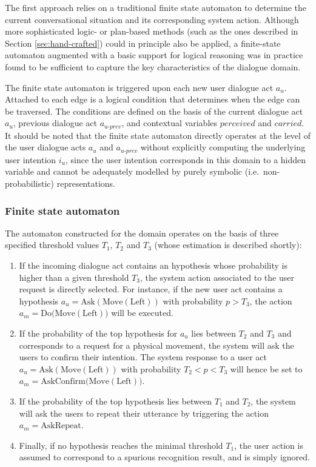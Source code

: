 The first approach relies on a traditional finite state automaton to determine the current conversational situation and its corresponding system action.  Although more sophisticated logic- or plan-based methods (such as the ones described in Section \ref{sec:hand-crafted}) could in principle also be applied, a finite-state automaton augmented with a basic support for logical reasoning was in practice found to be sufficient to capture the key characteristics of the dialogue domain. 

The finite state automaton is triggered upon each new user dialogue act $a_u$. Attached to each edge is a logical condition that determines when the edge can be traversed. The conditions are defined on the basis of the current dialogue act $a_u$, previous dialogue act $a_{u\mbox{-}prev}$, and contextual variables $\mathit{perceived}$ and $\mathit{carried}$. It should be noted that the finite state automaton directly operates at the level of the user dialogue acts $a_u$ and $a_{u\mbox{-}prev}$ without explicitly computing the underlying user intention $i_u$, since the user intention corresponds in this domain to a hidden variable and cannot be adequately modelled by purely symbolic (i.e.\ non-probabilistic) representations. 

\subsubsection*{Finite state automaton}

The automaton constructed for the domain operates on the basis of three specified threshold values $T_1$, $T_2$ and $T_3$ (whose estimation is described shortly):
\begin{enumerate}
\item If the incoming dialogue act contains an hypothesis whose probability is higher than a given threshold $T_3$, the system action associated to the user request is directly selected.  For instance, if the new user act contains a hypothesis $a_u = \mathrm{Ask(Move(Left))}$ with probability $p > T_3$, the action $a_m = \mathrm{Do(Move(Left)})$ will be executed.
\item If the probability of the top hypothesis for $a_u$ lies between $T_2$ and $T_3$ and corresponds to a request for a physical movement, the system will ask the users to confirm their intention.  The system response to a user act $a_u = \mathrm{Ask(Move(Left))}$ with probability $T_2 < p < T_3$ will hence be set to $a_m = \mathrm{AskConfirm(Move(Left)})$.
\item If the probability of the top hypothesis lies between $T_1$ and $T_2$, the system will ask the users to repeat their utterance by triggering the action $a_m = \mathrm{AskRepeat}$. 
\item Finally, if no hypothesis reaches the minimal threshold $T_1$, the user action is assumed to correspond to a spurious recognition result, and is simply ignored.
\end{enumerate}

